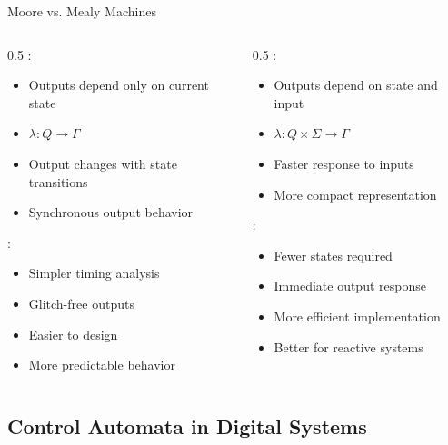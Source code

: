 \begin{frame}{Moore vs. Mealy Machines}
\begin{columns}
\begin{column}{0.5\textwidth}
:
\begin{itemize}
\item Outputs depend only on current state
\item $\lambda: Q \rightarrow \Gamma$
\item Output changes with state transitions
\item Synchronous output behavior
\end{itemize}

\vspace{0.3cm}
:
\begin{itemize}
\item Simpler timing analysis
\item Glitch-free outputs
\item Easier to design
\item More predictable behavior
\end{itemize}
\end{column}
\begin{column}{0.5\textwidth}
:
\begin{itemize}
\item Outputs depend on state and input
\item $\lambda: Q \times \Sigma \rightarrow \Gamma$
\item Faster response to inputs
\item More compact representation
\end{itemize}

\vspace{0.3cm}
:
\begin{itemize}
\item Fewer states required
\item Immediate output response
\item More efficient implementation
\item Better for reactive systems
\end{itemize}
\end{column}
\end{columns}
\end{frame}

\subsection{Control Automata in Digital Systems}

